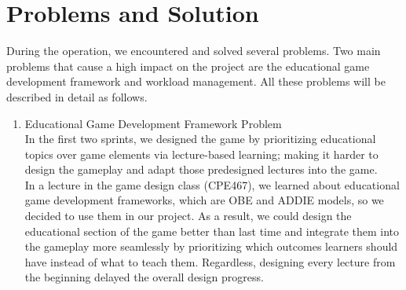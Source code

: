 \documentclass[12pt,oneside,openright,a4paper]{cpe-english-project}
\begin{document}
\section{Problems and Solution}
During the operation, we encountered and solved several problems. Two main problems that cause a high impact on the project are the educational game development framework and workload management. All these problems will be described in detail as follows.
\begin{enumerate}
	\item Educational Game Development Framework Problem \\
	In the first two sprints, we designed the game by prioritizing educational topics over game elements via lecture-based learning; making it harder to design the gameplay and adapt those predesigned lectures into the game. \\
	In a lecture in the game design class (CPE467), we learned about educational game development frameworks, which are OBE and ADDIE models, so we decided to use them in our project. As a result, we could design the educational section of the game better than last time and integrate them into the gameplay more seamlessly by prioritizing which outcomes learners should have instead of what to teach them. Regardless, designing every lecture from the beginning delayed the overall design progress.


\end{enumerate}
\end{document}
